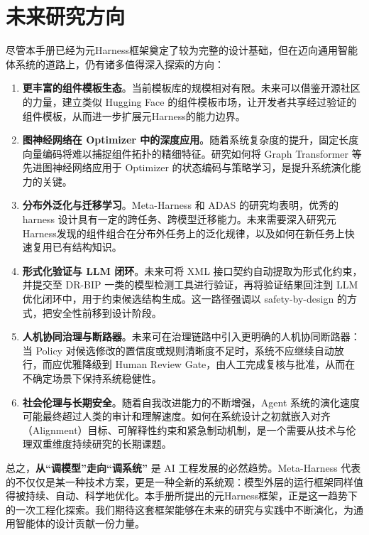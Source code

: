 \section{未来研究方向}

尽管本手册已经为元Harness框架奠定了较为完整的设计基础，但在迈向通用智能体系统的道路上，仍有诸多值得深入探索的方向：

\begin{enumerate}
    \item \textbf{更丰富的组件模板生态}。当前模板库的规模相对有限。未来可以借鉴开源社区的力量，建立类似 Hugging Face 的组件模板市场，让开发者共享经过验证的组件模板，从而进一步扩展元Harness的能力边界。
    
    \item \textbf{图神经网络在 Optimizer 中的深度应用}。随着系统复杂度的提升，固定长度向量编码将难以捕捉组件拓扑的精细特征。研究如何将 Graph Transformer 等先进图神经网络应用于 Optimizer 的状态编码与策略学习，是提升系统演化能力的关键。
    
    \item \textbf{分布外泛化与迁移学习}。Meta-Harness 和 ADAS 的研究均表明，优秀的 harness 设计具有一定的跨任务、跨模型迁移能力。未来需要深入研究元Harness发现的组件组合在分布外任务上的泛化规律，以及如何在新任务上快速复用已有结构知识。
    
    \item \textbf{形式化验证与 LLM 闭环}。未来可将 XML 接口契约自动提取为形式化约束，并提交至 DR-BIP 一类的模型检测工具进行验证，再将验证结果回注到 LLM 优化闭环中，用于约束候选结构生成。这一路径强调以 safety-by-design 的方式，把安全性前移到设计阶段。

    \item \textbf{人机协同治理与断路器}。未来可在治理链路中引入更明确的人机协同断路器：当 Policy 对候选修改的置信度或规则清晰度不足时，系统不应继续自动放行，而应优雅降级到 Human Review Gate，由人工完成复核与批准，从而在不确定场景下保持系统稳健性。
    
    \item \textbf{社会伦理与长期安全}。随着自我改进能力的不断增强，Agent 系统的演化速度可能最终超过人类的审计和理解速度。如何在系统设计之初就嵌入对齐（Alignment）目标、可解释性约束和紧急制动机制，是一个需要从技术与伦理双重维度持续研究的长期课题。
\end{enumerate}

总之，\textbf{从“调模型”走向“调系统”} 是 AI 工程发展的必然趋势。Meta-Harness 代表的不仅仅是某一种技术方案，更是一种全新的系统观：模型外层的运行框架同样值得被持续、自动、科学地优化。本手册所提出的元Harness框架，正是这一趋势下的一次工程化探索。我们期待这套框架能够在未来的研究与实践中不断演化，为通用智能体的设计贡献一份力量。
